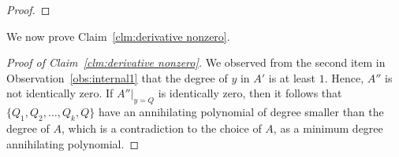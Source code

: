 \begin{proof}
\end{proof}

We now prove Claim~\ref{clm:derivative nonzero}.
\begin{proof}[Proof of Claim~\ref{clm:derivative nonzero}]
We observed from the second item in Observation~\ref{obs:internal1} that the degree of $y$ in $A'$ is at least $1$. Hence, $A''$ is not identically zero.  
If $A''|_{y = Q}$ is identically zero, then it follows that $\{Q_1, Q_2, \ldots, Q_k, Q\}$ have an annihilating polynomial of degree smaller than the degree of $A$, which is a contradiction to the choice of $A$, as a minimum degree annihilating polynomial. 
\end{proof}



